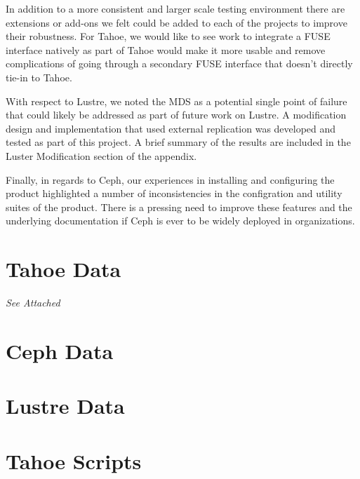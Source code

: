 \documentclass[11pt]{article}
\begin{document}
In addition to a more consistent and larger scale testing environment there 
are extensions or add-ons we felt could be added to each of the projects to
improve their robustness. For Tahoe, we would like to see work to integrate 
a FUSE interface natively as part of Tahoe would make it more usable and 
remove complications of going through a secondary FUSE interface that doesn't 
directly tie-in to Tahoe. 

With respect to Lustre, we noted the MDS as a potential single point of 
failure that could likely be addressed as part of future work on Lustre. A 
modification design and implementation that used external replication was 
developed and tested as part of this project. A brief summary of the results 
are included in the Luster Modification section of the appendix.

Finally, in regards to Ceph, our experiences in installing and configuring 
the product highlighted a number of inconsistencies in the configration and 
utility suites of the product. There is a pressing need to improve these 
features and the underlying documentation if Ceph is ever to be widely 
deployed in organizations. 

\nocite{*}


\appendix

\pagebreak
\section{Tahoe Data}
\label{sec:TahoeData}

\emph{See Attached}




\pagebreak
\section{Ceph Data}
\label{sec:CephData}

\pagebreak
\section{Lustre Data}
\label{sec:LustreData}

\pagebreak
\section{Tahoe Scripts}
\label{sec:TahoeScripts}
\end{document}
